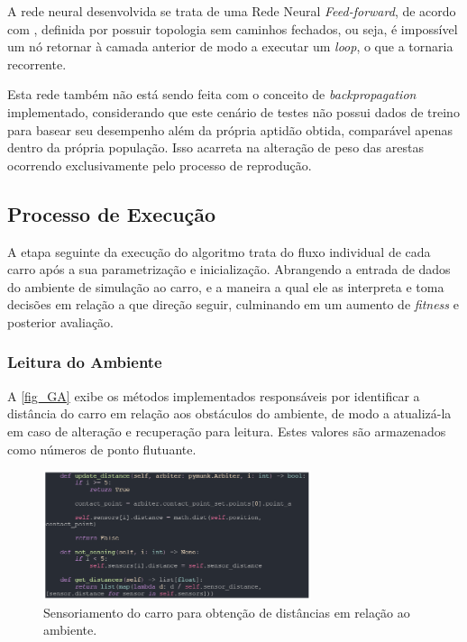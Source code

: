 A rede neural desenvolvida se trata de uma Rede Neural \textit{Feed-forward}, de acordo com , definida
por possuir topologia sem caminhos fechados, ou seja, é impossível um nó retornar à camada anterior de modo a executar um
\textit{loop}, o que a tornaria recorrente. 

Esta rede também não está sendo feita com o conceito de \textit{backpropagation} implementado, considerando que este cenário
de testes não possui dados de treino para basear seu desempenho além da própria aptidão obtida, comparável apenas dentro da própria população.
Isso acarreta na alteração de peso das arestas ocorrendo exclusivamente pelo processo de reprodução.

\subsection{Processo de Execução}
A etapa seguinte da execução do algoritmo trata do fluxo individual de cada carro após a sua parametrização e inicialização.
Abrangendo a entrada de dados do ambiente de simulação ao carro, e a maneira a qual ele as interpreta e toma decisões em relação a que direção seguir,
culminando em um aumento de \textit{fitness} e posterior avaliação.

\subsubsection{Leitura do Ambiente}
A \autoref{fig_GA} exibe os métodos implementados responsáveis por identificar a distância do carro em relação
aos obstáculos do ambiente, de modo a atualizá-la em caso de alteração e recuperação para leitura. Estes valores
são armazenados como números de ponto flutuante.

\begin{figure}[htb]
        \centering
        \caption{\label{fig_GA}Sensoriamento do carro para obtenção de distâncias em relação ao ambiente.}
        \includegraphics[width=0.7\textwidth]{images/GA.png}
\end{figure}

